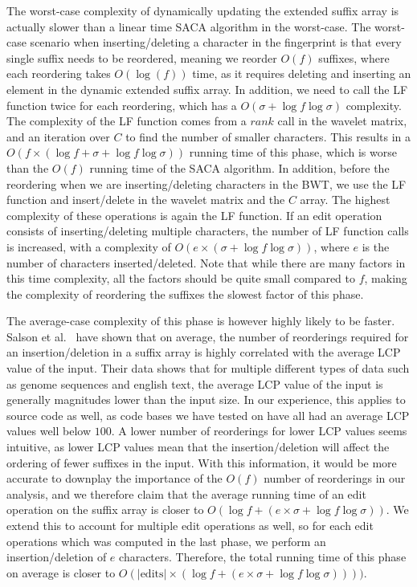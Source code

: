 The worst-case complexity of dynamically updating the extended suffix array is actually
slower than a linear time SACA algorithm in the worst-case. The worst-case scenario when
inserting/deleting a character in the fingerprint is that every single suffix needs to be
reordered, meaning we reorder $O(f)$ suffixes, where each reordering takes $O(\log(f))$
time, as it requires deleting and inserting an element in the dynamic extended suffix
array. In addition, we need to call the LF function twice for each reordering, which has a
$O(\sigma + \log f \log\sigma)$ complexity. The complexity of the LF function comes from a
$rank$ call in the wavelet matrix, and an iteration over $C$ to find the number of smaller
characters. This results in a $O(f \times (\log f + \sigma + \log f \log\sigma))$ running
time of this phase, which is worse than the $O(f)$ running time of the SACA algorithm. In
addition, before the reordering when we are inserting/deleting characters in the BWT, we
use the LF function and insert/delete in the wavelet matrix and the $C$ array. The highest
complexity of these operations is again the LF function. If an edit operation consists of
inserting/deleting multiple characters, the number of LF function calls is increased, with
a complexity of $O(e \times (\sigma + \log f \log\sigma))$, where $e$ is the number of
characters inserted/deleted. Note that while there are many factors in this time
complexity, all the factors should be quite small compared to $f$, making the complexity of
reordering the suffixes the slowest factor of this phase.

The average-case complexity of this phase is however highly likely to be faster. Salson et
al.~\cite{DynamicExtendedSuffixArraysReorderings} have shown that on average, the number
of reorderings required for an insertion/deletion in a suffix array is highly correlated
with the average LCP value of the input. Their data shows that for multiple different
types of data such as genome sequences and english text, the average LCP value of the
input is generally magnitudes lower than the input size. In our experience, this applies
to source code as well, as code bases we have tested on have all had an average LCP values
well below $100$. A lower number of reorderings for lower LCP values seems intuitive, as
lower LCP values mean that the insertion/deletion will affect the ordering of fewer
suffixes in the input. With this information, it would be more accurate to downplay the
importance of the $O(f)$ number of reorderings in our analysis, and we therefore claim
that the average running time of an edit operation on the suffix array is closer to $O(\log f +
(e \times \sigma + \log f \log\sigma))$. We extend this to account for multiple edit operations as
well, so for each edit operations which was computed in the last phase, we perform an
insertion/deletion of $e$ characters. Therefore, the total running time of this phase on
average is closer to $O(\vert\text{edits}\vert \times (\log f + (e \times \sigma + \log f
\log\sigma))))$.

